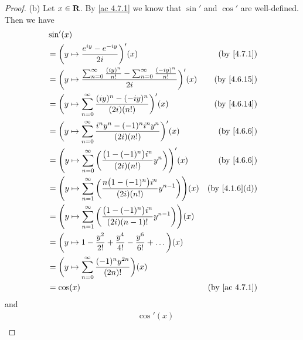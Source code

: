 \begin{proof}{(b)}
  Let \(x \in \mathbf{R}\).
  By \cref{ac 4.7.1} we know that \(\sin'\) and \(\cos'\) are well-defined.
  Then we have
  \begin{align*}
     & \sin'(x)                                                                                                                                               \\
     & = \bigg(y \mapsto \frac{e^{i y} - e^{- i y}}{2i}\bigg)'(x)                                                               & \text{(by \cref{4.7.1})}    \\
     & = \bigg(y \mapsto \frac{\sum_{n = 0}^\infty \frac{(i y)^n}{n!} - \sum_{n = 0}^\infty \frac{(- i y)^n}{n!}}{2i}\bigg)'(x) & \text{(by \cref{4.6.15})}   \\
     & = \bigg(y \mapsto \sum_{n = 0}^\infty \frac{(i y)^n - (- i y)^n}{(2i) (n!)}\bigg)'(x)                                    & \text{(by \cref{4.6.14})}   \\
     & = \bigg(y \mapsto \sum_{n = 0}^\infty \frac{i^n y^n - (-1)^n i^n y^n}{(2i) (n!)}\bigg)'(x)                               & \text{(by \cref{4.6.6})}    \\
     & = \Bigg(y \mapsto \sum_{n = 0}^\infty \bigg(\frac{\big(1 - (-1)^n\big) i^n}{(2i) (n!)} y^n\bigg)\Bigg)'(x)               & \text{(by \cref{4.6.6})}    \\
     & = \Bigg(y \mapsto \sum_{n = 1}^\infty \bigg(\frac{n \big(1 - (-1)^n\big) i^n}{(2i) (n!)} y^{n - 1}\bigg)\Bigg)(x)        & \text{(by \cref{4.1.6}(d))} \\
     & = \Bigg(y \mapsto \sum_{n = 1}^\infty \bigg(\frac{\big(1 - (-1)^n\big) i^n}{(2i) (n - 1)!} y^{n - 1}\bigg)\Bigg)(x)                                    \\
     & = \bigg(y \mapsto 1 - \frac{y^2}{2!} + \frac{y^4}{4!} - \frac{y^6}{6!} + \dots\bigg)(x)                                                                \\
     & = \bigg(y \mapsto \sum_{n = 0}^\infty \frac{(-1)^n y^{2n}}{(2n)!}\bigg)(x)                                                                             \\
     & = \cos(x)                                                                                                                & \text{(by \cref{ac 4.7.1})}
  \end{align*}
  and
  \begin{align*}
     & \cos'(x)                                                                                                                                              \\

\end{align*}
\end{proof}
